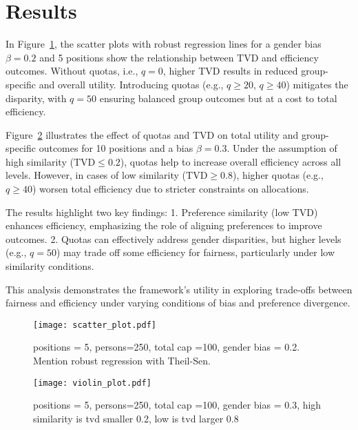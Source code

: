 \documentclass[letterpaper]{article}
\begin{document}
\section{Results}

In Figure~\ref{fig:scatter_plot}, the scatter plots with robust regression lines for a gender bias \( \beta = 0.2 \) and 5 positions show the relationship between TVD and efficiency outcomes. Without quotas, i.e., \( q=0 \), higher TVD results in reduced group-specific and overall utility. Introducing quotas (e.g., \( q\geq 20 \), \( q\geq 40 \)) mitigates the disparity, with \( q = 50 \) ensuring balanced group outcomes but at a cost to total efficiency.

Figure~\ref{fig:violin_plot} illustrates the effect of quotas and TVD on total utility and group-specific outcomes for 10 positions and a bias \( \beta = 0.3 \). Under the assumption of high similarity (\( \text{TVD} \leq 0.2 \)), quotas help to increase overall efficiency across all levels. However, in cases of low similarity (\( \text{TVD} \geq 0.8 \)), higher quotas (e.g., \( q \geq 40 \)) worsen total efficiency due to stricter constraints on allocations.

The results highlight two key findings:
1. Preference similarity (low TVD) enhances efficiency, emphasizing the role of aligning preferences to improve outcomes.
2. Quotas can effectively address gender disparities, but higher levels (e.g., \( q = 50 \)) may trade off some efficiency for fairness, particularly under low similarity conditions.

This analysis demonstrates the framework's utility in exploring trade-offs between fairness and efficiency under varying conditions of bias and preference divergence.

\begin{figure}[ht]

  \centering
  \texttt{[image: scatter\_plot.pdf]}
\caption{positions = 5, persons=250, total cap =100, gender bias = 0.2. Mention robust regression with Theil-Sen.}

  \label{fig:scatter_plot}
\end{figure}

\begin{figure}[ht]

  \centering
  \texttt{[image: violin\_plot.pdf]}
\caption{positions = 5, persons=250, total cap =100, gender bias = 0.3, high similarity is tvd smaller 0.2, low is tvd larger 0.8 }

  \label{fig:violin_plot}
\end{figure}
\end{document}
